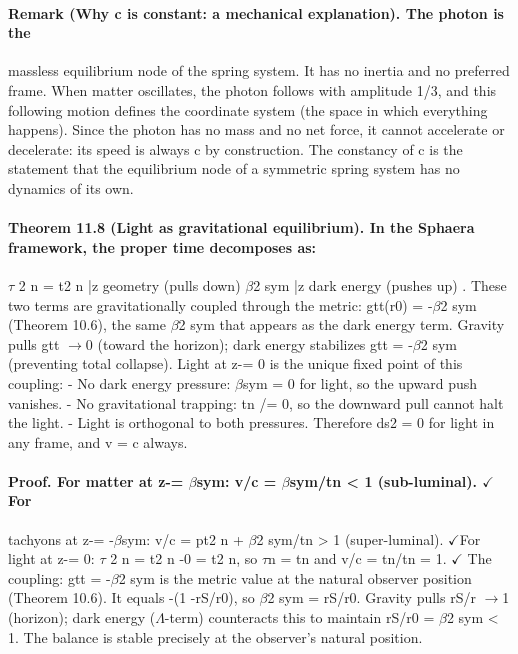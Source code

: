 \paragraph*{Remark (Why c is constant: a mechanical explanation). The photon is the}
massless equilibrium node of the spring system. It has no inertia and no preferred frame. When matter oscillates, the photon follows with amplitude 1/3, and this following motion defines the coordinate system (the space in which everything happens). Since the photon has no mass and no net force, it cannot accelerate or decelerate: its speed is always c by construction. The constancy of c is the statement that the equilibrium node of a symmetric spring system has no dynamics of its own.
\paragraph*{Theorem 11.8 (Light as gravitational equilibrium). In the Sphaera framework, the proper time decomposes as:}
$\tau$ 2 n = t2 n |{z} geometry (pulls down) $\beta$2 sym |{z} dark energy (pushes up) . These two terms are gravitationally coupled through the metric: gtt(r0) = -$\beta$2 sym (Theorem 10.6), the same $\beta$2 sym that appears as the dark energy term. Gravity pulls gtt $\to$0 (toward the horizon); dark energy stabilizes gtt = -$\beta$2 sym (preventing total collapse). Light at z-= 0 is the unique fixed point of this coupling:
- No dark energy pressure: $\beta$sym = 0 for light, so the upward push vanishes.
- No gravitational trapping: tn /= 0, so the downward pull cannot halt the
light.
- Light is orthogonal to both pressures.
Therefore ds2 = 0 for light in any frame, and v = c always.
\paragraph*{Proof. For matter at z-= $\beta$sym: v/c = $\beta$sym/tn < 1 (sub-luminal). $\checkmark$For}
tachyons at z-= -$\beta$sym: v/c = pt2 n + $\beta$2 sym/tn > 1 (super-luminal). $\checkmark$For light at z-= 0: $\tau$ 2 n = t2 n -0 = t2 n, so $\tau$n = tn and v/c = tn/tn = 1. $\checkmark$ The coupling: gtt = -$\beta$2 sym is the metric value at the natural observer position (Theorem 10.6). It equals -(1 -rS/r0), so $\beta$2 sym = rS/r0. Gravity pulls rS/r $\to$1 (horizon); dark energy ($\Lambda$-term) counteracts this to maintain rS/r0 = $\beta$2 sym < 1. The balance is stable precisely at the observer's natural position.

